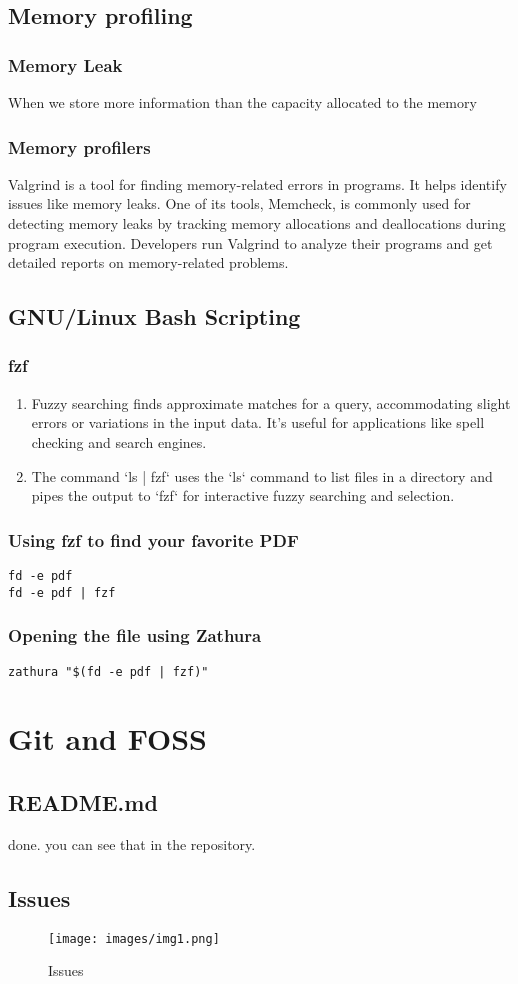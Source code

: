 \documentclass[titlepage]{article}
\begin{document}
\subsection{Memory profiling}

\subsubsection{Memory Leak}
When we store more information than the capacity allocated to the memory
\subsubsection{Memory profilers}
Valgrind is a tool for finding memory-related errors in programs. It helps identify issues like memory leaks. One of its tools, Memcheck, is commonly used for detecting memory leaks by tracking memory allocations and deallocations during program execution. Developers run Valgrind to analyze their programs and get detailed reports on memory-related problems.
\newpage
\subsection{GNU/Linux Bash Scripting}
\subsubsection{fzf}
\begin{enumerate}
    \item Fuzzy searching finds approximate matches for a query, accommodating slight errors or variations in the input data. It's useful for applications like spell checking and search engines.

    \item The command `ls | fzf` uses the `ls` command to list files in a directory and pipes the output to `fzf` for interactive fuzzy searching and selection.
\end{enumerate}
\subsubsection{Using fzf to find your favorite PDF}
\begin{verbatim}
fd -e pdf
fd -e pdf | fzf
\end{verbatim}
\subsubsection{Opening the file using Zathura}
\begin{verbatim}
zathura "$(fd -e pdf | fzf)"
\end{verbatim}
\section{Git and FOSS}
\subsection{README.md}
done. you can see that in the repository.

\subsection{Issues}
\begin{figure}[h]
    \centering
    \texttt{[image: images/img1.png]}
    \caption{Issues}
\end{figure}
\end{document}
